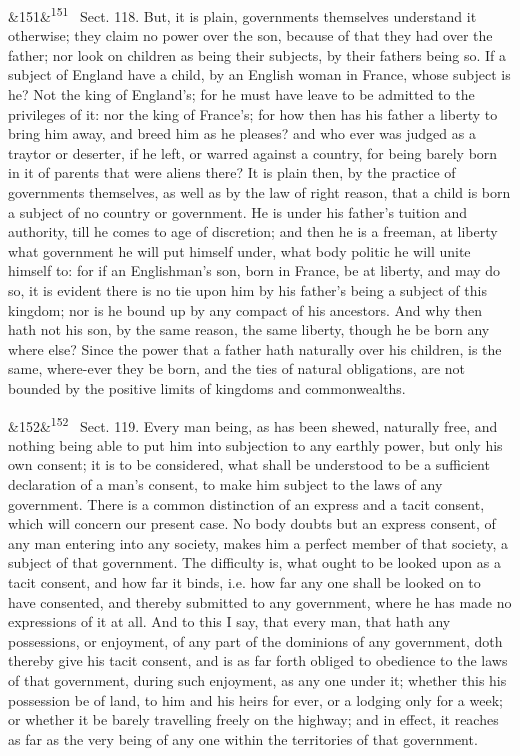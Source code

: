 \documentclass[12pt]{article}
\newcommand{\para}[1][]{\par\noindent\ifx&#1&\else\textsuperscript{\footnotesize #1}~\fi}
\begin{document}
\para[151] Sect. 118. But, it is plain, governments themselves understand it otherwise; they claim no power over the son, because of that they had over the father; nor look on children as being their subjects, by their fathers being so. If a subject of England have a child, by an English woman in France, whose subject is he? Not the king of England's; for he must have leave to be admitted to the privileges of it: nor the king of France's; for how then has his father a liberty to bring him away, and breed him as he pleases? and who ever was judged as a traytor or deserter, if he left, or warred against a country, for being barely born in it of parents that were aliens there? It is plain then, by the practice of governments themselves, as well as by the law of right reason, that a child is born a subject of no country or government. He is under his father's tuition and authority, till he comes to age of discretion; and then he is a freeman, at liberty what government he will put himself under, what body politic he will unite himself to: for if an Englishman's son, born in France, be at liberty, and may do so, it is evident there is no tie upon him by his father's being a subject of this kingdom; nor is he bound up by any compact of his ancestors. And why then hath not his son, by the same reason, the same liberty, though he be born any where else? Since the power that a father hath naturally over his children, is the same, where-ever they be born, and the ties of natural obligations, are not bounded by the positive limits of kingdoms and commonwealths.

\para[152] Sect. 119. Every man being, as has been shewed, naturally free, and nothing being able to put him into subjection to any earthly power, but only his own consent; it is to be considered, what shall be understood to be a sufficient declaration of a man's consent, to make him subject to the laws of any government. There is a common distinction of an express and a tacit consent, which will concern our present case. No body doubts but an express consent, of any man entering into any society, makes him a perfect member of that society, a subject of that government. The difficulty is, what ought to be looked upon as a tacit consent, and how far it binds, i.e. how far any one shall be looked on to have consented, and thereby submitted to any government, where he has made no expressions of it at all. And to this I say, that every man, that hath any possessions, or enjoyment, of any part of the dominions of any government, doth thereby give his tacit consent, and is as far forth obliged to obedience to the laws of that government, during such enjoyment, as any one under it; whether this his possession be of land, to him and his heirs for ever, or a lodging only for a week; or whether it be barely travelling freely on the highway; and in effect, it reaches as far as the very being of any one within the territories of that government.
\end{document}
